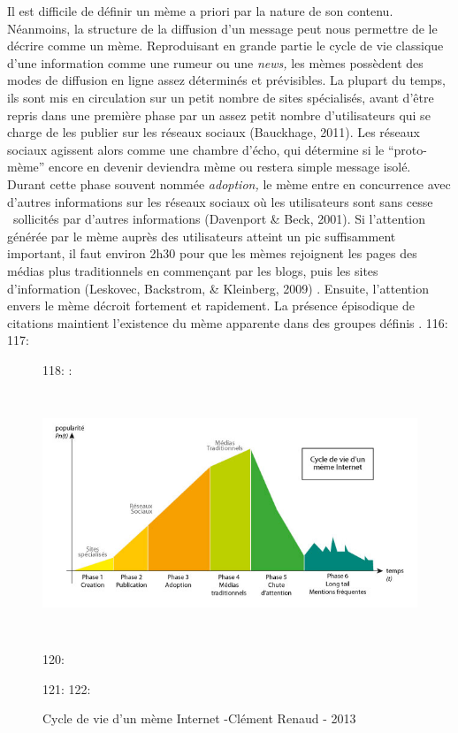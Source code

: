 Il est difficile de d\'efinir un m\`eme a priori par la nature de son contenu. N\'eanmoins, la structure de la diffusion d{\textquoteright}un message peut nous permettre de le d\'ecrire comme un m\`eme. Reproduisant en grande partie le cycle de vie classique d{\textquoteright}une information comme une rumeur ou une \textit{news, }les m\`emes poss\`edent des modes de diffusion en ligne assez d\'etermin\'es et pr\'evisibles. La plupart du temps, ils sont mis en circulation sur un petit nombre de sites sp\'ecialis\'es, avant d{\textquoteright}\^etre repris dans une premi\`ere phase par un assez petit nombre d{\textquoteright}utilisateurs qui se charge de les publier sur les r\'eseaux sociaux (Bauckhage, 2011). Les r\'eseaux sociaux agissent alors comme une chambre d{\textquoteright}\'echo, qui d\'etermine si le {\textquotedblleft}proto-m\`eme{\textquotedblright} encore en devenir deviendra m\`eme ou restera simple message isol\'e. Durant cette phase souvent nomm\'ee \textit{adoption,} le m\`eme entre en concurrence avec d{\textquoteright}autres informations sur les r\'eseaux sociaux o\`u les utilisateurs sont sans cesse \ sollicit\'es par d{\textquoteright}autres informations (Davenport \& Beck, 2001). Si l{\textquoteright}attention g\'en\'er\'ee par le m\`eme aupr\`es des utilisateurs atteint un pic suffisamment important, il faut environ 2h30 pour que les m\`emes rejoignent les pages des m\'edias plus traditionnels en commen\c{c}ant par les blogs, puis les sites d{\textquoteright}information (Leskovec, Backstrom, \& Kleinberg, 2009) . Ensuite, l{\textquoteright}attention envers le m\`eme d\'ecroit fortement et rapidement. La pr\'esence \'episodique de citations maintient l{\textquoteright}existence du m\`eme apparente dans des groupes d\'efinis \cite{Buchel2012}.
116: 
117: \begin{figure}[h]
118:     :     \includegraphics[width=6.2559in,height=3.1559in]{figures/chap2/chapitre2-img2.jpg}
120:     \caption[Cycle de vie d{\textquoteright}un m\`eme Internet]{Cycle de vie d{\textquoteright}un m\`eme Internet -Cl\'ement Renaud - 2013}
121:     \label{fig:meme-lifecycle}
122: \end{figure}
